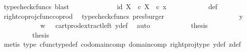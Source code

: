 \begin{isabellebody}
\ {\isacharparenleft}{\kern0pt}typecheck{\isacharunderscore}{\kern0pt}cfuncs{\isacharcomma}{\kern0pt}\ blast{\isacharparenright}{\kern0pt}\isanewline
\ \ \ \ \ \ \ \ \isamarkupfalse%
\ \isamarkupfalse%
\ {\isachardoublequoteopen}{\isachardot}{\kern0pt}{\isachardot}{\kern0pt}{\isachardot}{\kern0pt}\ {\isacharequal}{\kern0pt}\ {\isasymlangle}id\ X{\isacharcomma}{\kern0pt}\ {\isasymf}\ {\isasymcirc}\isactrlsub c\ {\isasymbeta}\isactrlbsub X\isactrlesub {\isasymrangle}\ \ {\isasymcirc}\isactrlsub c\ x{\isachardoublequoteclose}\isanewline
\ \ \ \ \ \ \ \ \ \ \isamarkupfalse%
\ {\isasymrho}{\isacharunderscore}{\kern0pt}def\ \ \isamarkupfalse%
\ right{\isacharunderscore}{\kern0pt}coproj{\isacharunderscore}{\kern0pt}cfunc{\isacharunderscore}{\kern0pt}coprod\ \isamarkupfalse%
\ {\isacharparenleft}{\kern0pt}typecheck{\isacharunderscore}{\kern0pt}cfuncs{\isacharcomma}{\kern0pt}\ presburger{\isacharparenright}{\kern0pt}\ \ \ \ \ \ \ \ \isanewline
\ \ \ \ \ \ \ \ \isamarkupfalse%
\ \isamarkupfalse%
\ {\isachardoublequoteopen}{\isachardot}{\kern0pt}{\isachardot}{\kern0pt}{\isachardot}{\kern0pt}\ {\isacharequal}{\kern0pt}\ y{\isachardoublequoteclose}\isanewline
\ \ \ \ \ \ \ \ \ \ \isamarkupfalse%
\ {\isacartoucheopen}w\ {\isacharequal}{\kern0pt}\ {\isasymf}{\isacartoucheclose}\ cart{\isacharunderscore}{\kern0pt}prod{\isacharunderscore}{\kern0pt}extract{\isacharunderscore}{\kern0pt}left\ y{\isacharunderscore}{\kern0pt}def\ \isamarkupfalse%
\ auto\isanewline
\ \ \ \ \ \ \ \ \isamarkupfalse%
\ \isamarkupfalse%
\ {\isacharquery}{\kern0pt}thesis\isacommand{{\isachardot}{\kern0pt}}\isamarkupfalse%
\isanewline
\ \ \ \ \ \ \isamarkupfalse%
\isanewline
\ \ \ \ \ \ \isamarkupfalse%
\ \isamarkupfalse%
\ {\isacharquery}{\kern0pt}thesis\isanewline
\ \ \ \ \ \ \ \ \isamarkupfalse%
\ {\isacharparenleft}{\kern0pt}metis\ {\isasymrho}{\isacharunderscore}{\kern0pt}type\ cfunc{\isacharunderscore}{\kern0pt}type{\isacharunderscore}{\kern0pt}def\ codomain{\isacharunderscore}{\kern0pt}comp\ domain{\isacharunderscore}{\kern0pt}comp\ right{\isacharunderscore}{\kern0pt}proj{\isacharunderscore}{\kern0pt}type\ y{\isacharunderscore}{\kern0pt}def\ z{\isacharunderscore}{\kern0pt}def{\isacharparenright}{\kern0pt}\isanewline
\ \ \ \ \isamarkupfalse%
\isanewline
\ \ \isamarkupfalse%
\isanewline
\ \ \isamarkupfalse%

\end{isabellebody}
